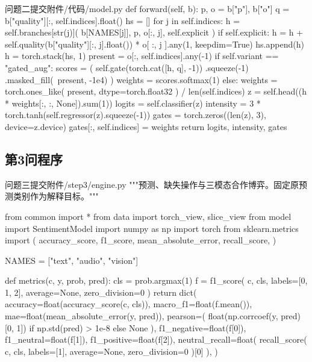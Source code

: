 \begin{appendices}
\begin{Python}{问题二提交附件/代码/model.py}
    def forward(self, b):
        p, o = b["p"], b["o"]
        q = b["quality"][:, self.indices].float()
        hs = []
        for j in self.indices:
            h = self.branches[str(j)](
                b[NAMES[j]], p, o[:, j], self.explicit
            )
            if self.explicit:
                h = h + self.quality(b["quality"][:, j].float()) * o[
                    :, j
                ].any(1, keepdim=True)
            hs.append(h)
        h = torch.stack(hs, 1)
        present = o[:, self.indices].any(-1)
        if self.variant == "gated_aug":
            scores = (
                self.gate(torch.cat([h, q], -1))
                .squeeze(-1)
                .masked_fill(~present, -1e4)
            )
            weights = scores.softmax(1)
        else:
            weights = torch.ones_like(
                present, dtype=torch.float32
            ) / len(self.indices)
        z = self.head((h * weights[:, :, None]).sum(1))
        logits = self.classifier(z)
        intensity = 3 * torch.tanh(self.regressor(z).squeeze(-1))
        gates = torch.zeros((len(z), 3), device=z.device)
        gates[:, self.indices] = weights
        return logits, intensity, gates
\end{Python}

\vspace{2ex}

\clearpage
\subsection{第3问程序}
\vspace{-2ex}

\begin{Python}{问题三提交附件/step3/engine.py}
"""预测、缺失操作与三模态合作博弈。固定原预测类别作为解释目标。"""

from common import *
from data import torch_view, slice_view
from model import SentimentModel
import numpy as np
import torch
from sklearn.metrics import (
    accuracy_score,
    f1_score,
    mean_absolute_error,
    recall_score,
)

NAMES = ["text", "audio", "vision"]


def metrics(c, y, prob, pred):
    cls = prob.argmax(1)
    f = f1_score(
        c, cls, labels=[0, 1, 2], average=None, zero_division=0
    )
    return dict(
        accuracy=float(accuracy_score(c, cls)),
        macro_f1=float(f.mean()),
        mae=float(mean_absolute_error(y, pred)),
        pearson=(
            float(np.corrcoef(y, pred)[0, 1])
            if np.std(pred) > 1e-8
            else None
        ),
        f1_negative=float(f[0]),
        f1_neutral=float(f[1]),
        f1_positive=float(f[2]),
        neutral_recall=float(
            recall_score(
                c, cls, labels=[1], average=None, zero_division=0
            )[0]
        ),
    )



\end{Python}
\end{appendices}
